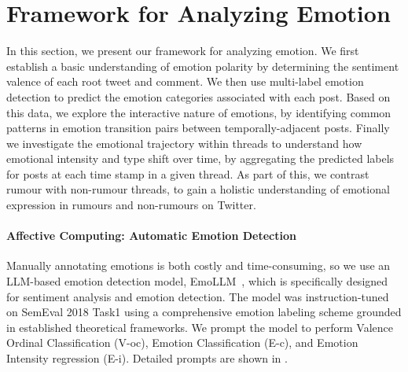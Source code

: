 \section{Framework for Analyzing Emotion}
In this section, we present our framework for analyzing emotion. We first establish a basic understanding of emotion polarity by determining the sentiment valence of each root tweet and comment. We then use multi-label emotion detection to predict the emotion categories associated with each post. Based on this data, we explore the interactive nature of emotions, by identifying common patterns in emotion transition pairs between temporally-adjacent posts. Finally we investigate the emotional trajectory within threads to understand how emotional intensity and type shift over time, by aggregating the predicted labels for posts at each time stamp in a given thread. As part of this, we contrast rumour with non-rumour threads, to gain a holistic understanding of emotional expression in rumours and non-rumours on Twitter.

\paragraph{Affective Computing: Automatic Emotion Detection}
Manually annotating emotions is both costly and time-consuming, so we use an LLM-based emotion detection model, EmoLLM~\citep{liu2024emollms}, which is specifically designed for sentiment analysis and emotion detection. The model was instruction-tuned on SemEval 2018 Task1 using a comprehensive emotion labeling scheme grounded in established theoretical frameworks. We prompt the model to perform Valence Ordinal Classification (V-oc), Emotion Classification (E-c), and Emotion Intensity regression (E-i). Detailed prompts are shown in .

